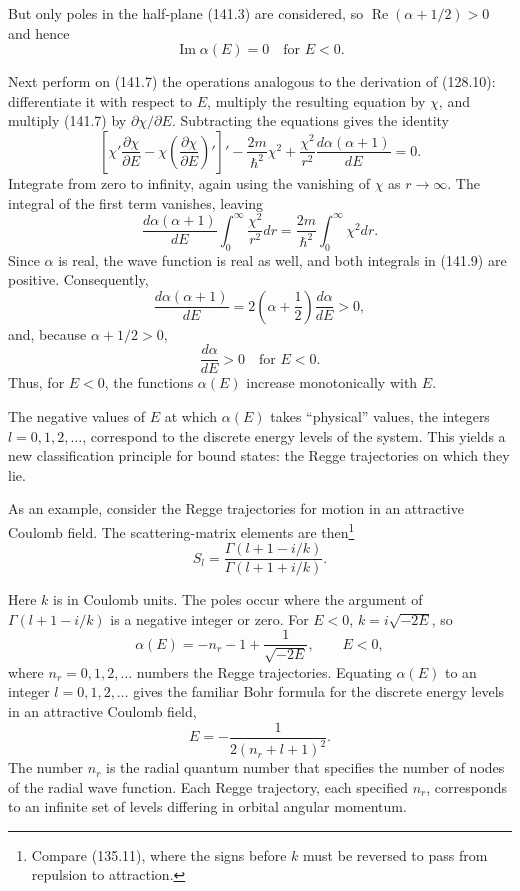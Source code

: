 But only poles in the half-plane (141.3) are considered, so
$\operatorname{Re}(\alpha+1/2)>0$ and hence
\begin{equation}
 \operatorname{Im}\alpha(E)=0\quad\text{for }E<0.
 \tag{141.8}
\end{equation}

Next perform on (141.7) the operations analogous to the derivation of
(128.10): differentiate it with respect to $E$, multiply the resulting
equation by $\chi$, and multiply (141.7) by $\partial\chi/\partial E$.
Subtracting the equations gives the identity
\[
 \left[\chi'\frac{\partial\chi}{\partial E}
 -\chi\left(\frac{\partial\chi}{\partial E}\right)'\right]'
 -\frac{2m}{\hbar^2}\chi^2
 +\frac{\chi^2}{r^2}\frac{d\alpha(\alpha+1)}{dE}=0.
\]
Integrate from zero to infinity, again using the vanishing of $\chi$ as
$r\to\infty$. The integral of the first term vanishes, leaving
\begin{equation}
 \frac{d\alpha(\alpha+1)}{dE}\int_0^\infty\frac{\chi^2}{r^2}dr
 =\frac{2m}{\hbar^2}\int_0^\infty\chi^2dr.
 \tag{141.9}
\end{equation}
Since $\alpha$ is real, the wave function is real as well, and both integrals
in (141.9) are positive. Consequently,
\[
 \frac{d\alpha(\alpha+1)}{dE}
 =2\left(\alpha+\frac12\right)\frac{d\alpha}{dE}>0,
\]
and, because $\alpha+1/2>0$,
\[
 \frac{d\alpha}{dE}>0\quad\text{for }E<0.
\]
Thus, for $E<0$, the functions $\alpha(E)$ increase monotonically with $E$.

The negative values of $E$ at which $\alpha(E)$ takes ``physical'' values,
the integers $l=0,1,2,\ldots$, correspond to the discrete energy levels of
the system. This yields a new classification principle for bound states: the
Regge trajectories on which they lie.

As an example, consider the Regge trajectories for motion in an attractive
Coulomb field. The scattering-matrix elements are then\footnote{Compare
(135.11), where the signs before $k$ must be reversed to pass from repulsion
to attraction.}
\begin{equation}
 S_l=\frac{\Gamma(l+1-i/k)}{\Gamma(l+1+i/k)}.
 \tag{141.10}
\end{equation}

Here $k$ is in Coulomb units. The poles occur where the argument of
$\Gamma(l+1-i/k)$ is a negative integer or zero. For $E<0$,
$k=i\sqrt{-2E}$, so
\begin{equation}
 \alpha(E)=-n_r-1+\frac1{\sqrt{-2E}},\qquad E<0,
 \tag{141.11}
\end{equation}
where $n_r=0,1,2,\ldots$ numbers the Regge trajectories. Equating
$\alpha(E)$ to an integer $l=0,1,2,\ldots$ gives the familiar Bohr formula for
the discrete energy levels in an attractive Coulomb field,
\[
 E=-\frac1{2(n_r+l+1)^2}.
\]
The number $n_r$ is the radial quantum number that specifies the number of
nodes of the radial wave function. Each Regge trajectory, each specified
$n_r$, corresponds to an infinite set of levels differing in orbital angular
momentum.

